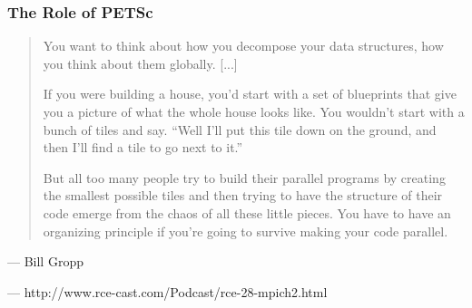

\begin{frame}[fragile]

\frametitle{The Role of PETSc}

\vspace*{\fill}
\begin{minipage}{\linewidth}
\begin{quote}
\Large You want to think about how you decompose your data
structures, how you think about them globally. [...] 

\medskip 

If you
were building a house, you'd start with a set of blueprints
that give you a picture of what the whole house looks
like. You wouldn’t start with a bunch of tiles and say.
``Well I'll put this tile down on the ground, and then I'll
find a tile to go next to it.''

\medskip

But all too many people try to
build their parallel programs by creating the smallest
possible tiles and then trying to have the structure of
their code emerge from the chaos of all these little
pieces. You have to have an organizing principle if
you're going to survive making your code parallel.

\end{quote}

\qquad --- Bill Gropp

\qquad --- http://www.rce-cast.com/Podcast/rce-28-mpich2.html
\end{minipage}
\vspace*{\fill}\vspace*{\fill}

\end{frame}
